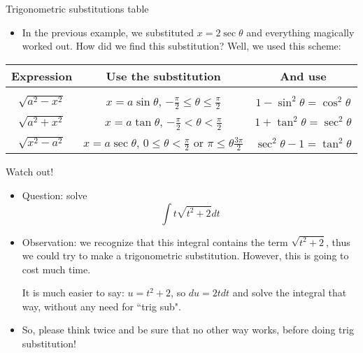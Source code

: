 \begin{frame}{Trigonometric substitutions table}
    \begin{itemize}
        \item In the previous example, we substituted $x=2\sec\theta$ and everything magically worked out. How did we find this substitution? Well, we used this scheme:
        \end{itemize}

        \begin{tcolorbox}[colback=yellow!50,colframe=violet!85!black,title=Trigonometric substitutions for integration]
            \centering
        \begin{tabular}{ |c|c|c| } 
         \hline
         Expression & Use the substitution & And use \\
         \hline\hline&&\\[-2.2ex]
         $\sqrt{a^2-x^2}$ & $x=a\sin\theta$, $-\frac\pi2\leq\theta\leq\frac\pi2$ & $1-\sin^2\theta=\cos^2\theta$ \\ 
         $\sqrt{a^2+x^2}$ & $x=a\tan\theta$, $-\frac\pi2<\theta<\frac\pi2$ &  $1+\tan^2\theta=\sec^2\theta$ \\ 
         $\sqrt{x^2-a^2}$ & $x=a\sec\theta$, {\footnotesize$0\leq\theta<\frac\pi2$ or $\pi\leq\theta\frac{3\pi}2$} &  $\sec^2\theta-1=\tan^2\theta$\\ 
         \hline
         
        \end{tabular}
        
        \end{tcolorbox}
    
\end{frame}

\begin{frame}{Watch out!}
    \begin{itemize}
        \item Question: solve \[\int t\sqrt{t^2+2}dt\]
        \item\pause Observation: we recognize that this integral contains the term $\sqrt{t^2+2}$, thus we could try to make a trigonometric substitution. \pause However, this is going to cost much time.

        It is much easier to say: $u=t^2+2$, so $du=2tdt$ and solve the integral that way, without any need for ``trig sub".

        \pause\item So, please think twice and be sure that no other way works, before doing trig substitution!
    \end{itemize}
\end{frame}

